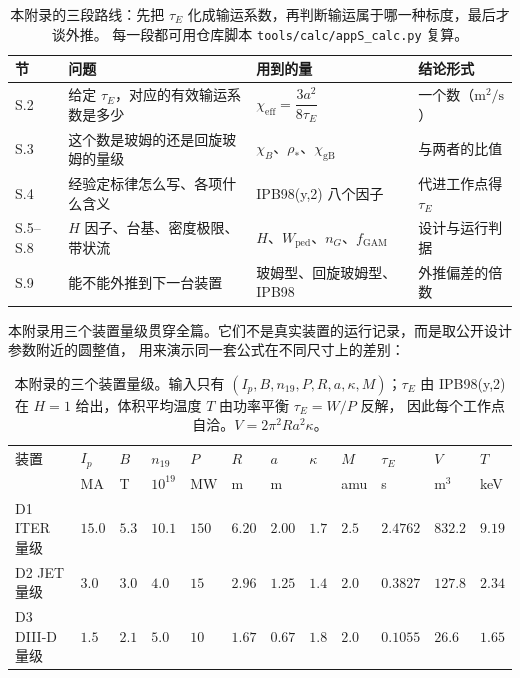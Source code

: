 \begin{table}[htbp]
  \centering
  \caption{本附录的三段路线：先把 $\tau_E$ 化成输运系数，再判断输运属于哪一种标度，最后才谈外推。
    每一段都可用仓库脚本 \texttt{tools/\allowbreak{}calc/\allowbreak{}appS\_calc.py} 复算。}
  \label{tab:app-s-map}
  \begin{tabular}{@{}p{1.2cm}p{4.4cm}p{5.4cm}p{4.6cm}@{}}
    \toprule
    节 & 问题 & 用到的量 & 结论形式 \\
    \midrule
    S.2 & 给定 $\tau_E$，对应的有效输运系数是多少 & $\chi_{\mathrm{eff}}=\dfrac{3a^2}{8\tau_E}$ & 一个数（$\mathrm{m^2/s}$）\\
    S.3 & 这个数是玻姆的还是回旋玻姆的量级 & $\chi_B$、$\rho_\ast$、$\chi_{\mathrm{gB}}$ & 与两者的比值 \\
    S.4 & 经验定标律怎么写、各项什么含义 & IPB98(y,2) 八个因子 & 代进工作点得 $\tau_E$ \\
    S.5--S.8 & $H$ 因子、台基、密度极限、带状流 & $H$、$W_{\mathrm{ped}}$、$n_G$、$f_{\mathrm{GAM}}$ & 设计与运行判据 \\
    S.9 & 能不能外推到下一台装置 & 玻姆型、回旋玻姆型、IPB98 & 外推偏差的倍数 \\
    \bottomrule
  \end{tabular}
\end{table}

本附录用三个装置量级贯穿全篇。它们不是真实装置的运行记录，而是取公开设计参数附近的圆整值，
用来演示同一套公式在不同尺寸上的差别：

\begin{table}[htbp]
  \centering
  \caption{本附录的三个装置量级。输入只有 $(I_p,B,n_{19},P,R,a,\kappa,M)$；$\tau_E$ 由
    IPB98(y,2) 在 $H=1$ 给出，体积平均温度 $T$ 由功率平衡 $\tau_E=W/P$ 反解，
    因此每个工作点自洽。$V=2\pi^2Ra^2\kappa$。}
  \label{tab:app-s-devices}
  \begin{tabular}{@{}p{2.5cm}p{0.9cm}p{0.9cm}p{1.0cm}p{1.0cm}p{0.9cm}p{0.9cm}p{0.9cm}p{0.9cm}p{1.2cm}p{1.1cm}p{1.3cm}@{}}
    \toprule
    装置 & $I_p$ & $B$ & $n_{19}$ & $P$ & $R$ & $a$ & $\kappa$ & $M$ & $\tau_E$ & $V$ & $T$ \\
     & MA & T & $10^{19}$ & MW & m & m & & amu & s & $\mathrm{m^3}$ & keV \\
    \midrule
    D1 ITER 量级 & $15.0$ & $5.3$ & $10.1$ & $150$ & $6.20$ & $2.00$ & $1.7$ & $2.5$ & $2.4762$ & $832.2$ & $9.19$ \\
    D2 JET 量级 & $3.0$ & $3.0$ & $4.0$ & $15$ & $2.96$ & $1.25$ & $1.4$ & $2.0$ & $0.3827$ & $127.8$ & $2.34$ \\
    D3 DIII-D 量级 & $1.5$ & $2.1$ & $5.0$ & $10$ & $1.67$ & $0.67$ & $1.8$ & $2.0$ & $0.1055$ & $26.6$ & $1.65$ \\
    \bottomrule
  \end{tabular}
\end{table}

